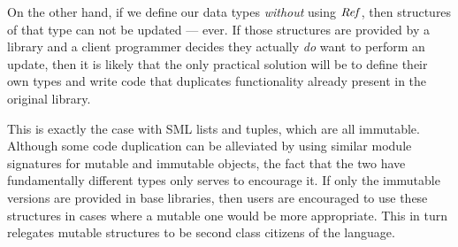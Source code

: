 On the other hand, if we define our data types \emph{without} using $\operatorname{\mathit{Ref}}$, then structures of that type can not be updated --- ever. If those structures are provided by a library and a client programmer decides they actually \emph{do} want to perform an update, then it is likely that the only practical solution will be to define their own types and write code that duplicates functionality already present in the original library.

This is exactly the case with SML lists and tuples, which are all immutable. Although some code duplication can be alleviated by using similar module signatures for mutable and immutable objects, the fact that the two have fundamentally different types only serves to encourage it. If only the immutable versions are provided in base libraries, then users are encouraged to use these structures in cases where a mutable one would be more appropriate. This in turn relegates mutable structures to be second class citizens of the language.

